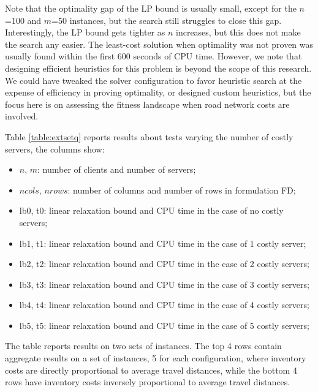 \documentclass[opre,sglanonrev,11pt]{informs4}
\begin{document}
Note that the optimality gap of the LP bound is usually small, except for the $n$=100 and $m$=50 instances, but the search still struggles to close this gap. Interestingly, the LP bound gets tighter as $n$ increases, but this does not make the search any easier.
The least-cost solution when optimality was not proven was usually found within the first 600 seconds of CPU time. However, we note that designing efficient heuristics for this problem is beyond the scope of this research. We could have tweaked the solver configuration to favor heuristic search at the expense of efficiency in proving optimality, or designed custom heuristics, but the focus here is on assessing the fitness landscape when road network costs are involved.

Table \ref{table:extsetq} reports results about tests varying the number of costly servers, the columns show:
\begin{itemize}
	\item $n$, $m$: number of clients and number of servers;
	\item $ncols$, $nrows$: number of columns and number of rows in formulation FD;
	\item lb0, t0: linear relaxation bound and CPU time in the case of no costly servers;
	\item lb1, t1: linear relaxation bound and CPU time in the case of 1 costly server;
	\item lb2, t2: linear relaxation bound and CPU time in the case of 2 costly servers;
	\item lb3, t3: linear relaxation bound and CPU time in the case of 3 costly servers;
	\item lb4, t4: linear relaxation bound and CPU time in the case of 4 costly servers;
	\item lb5, t5: linear relaxation bound and CPU time in the case of 5 costly servers;
\end{itemize}

The table reports results on two sets of instances. The top 4 rows contain aggregate results on a set of instances, 5 for each configuration, where inventory costs are directly proportional to average travel distances, while the bottom 4 rows have inventory costs inversely proportional to average travel distances.
\end{document}
